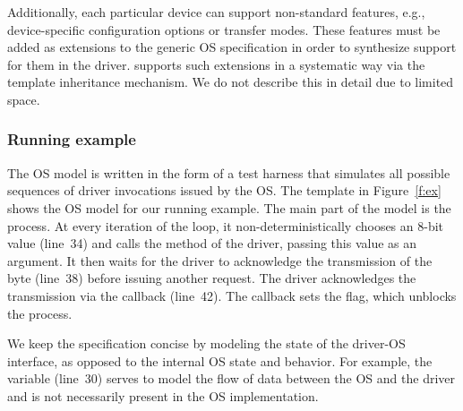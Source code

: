 
Additionally, each particular device can support non-standard features, e.g., device-specific configuration options or transfer modes.  These features must be added as extensions to the generic OS specification in order to synthesize support for them in the driver.  \tsl supports such extensions in a systematic way via the template inheritance mechanism.  We do not describe this in detail due to limited space.

\subsubsection{Running example}

The OS model is written in the form of a test harness that simulates all possible sequences of driver invocations issued by the OS.  The  template in Figure~\ref{f:ex} shows the OS model for our running example.  The main part of the model is the  process.  At every iteration of the loop, it non-deterministically chooses an 8-bit value (line~34) and calls the  method of the driver, passing this value as an argument.  It then waits for the driver to acknowledge the transmission of the byte (line~38) before issuing another request.  The driver acknowledges the transmission via the  callback (line~42).  The callback sets the  flag, which unblocks the  process.

We keep the specification concise by modeling the state of the driver-OS interface, as opposed to the internal OS state and behavior.  For example, the  variable (line~30) serves to model the flow of data between the OS and the driver and is not necessarily present in the OS implementation.



